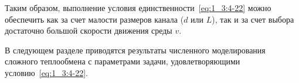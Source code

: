 Таким образом, выполнение условия единственности~\eqref{eq:1_3:4-22}
можно обеспечить как за счет малости размеров канала ($d$ или $L$),
так и за счет выбора достаточно большой скорости движения среды $v$.


В следующем разделе приводятся результаты численного моделирования
сложного теплообмена с параметрами задачи, удовлетворяющими
условию~\eqref{eq:1_3:4-22}.
